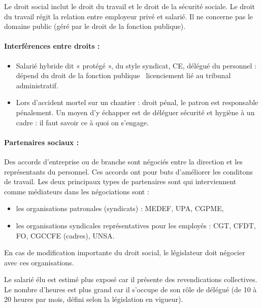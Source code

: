 Le droit social inclut le droit du travail et le droit de la sécurité sociale.
Le droit du travail régit la relation entre employeur privé et salarié.
Il ne concerne pas le domaine public (géré par le droit de la fonction publique).

\paragraph{Interférences entre droits :}
	\begin{itemize}
		\item[\textbullet] Salarié hybride dit « protégé », du style syndicat, CE, délégué du personnel : dépend du droit de la fonction publique \textrightarrow\ licenciement lié au tribunal administratif.
		\item[\textbullet] Lors d’accident mortel sur un chantier : droit pénal, le patron est responsable pénalement. Un moyen d'y échapper est de déléguer sécurité et hygiène à un cadre : il faut savoir ce à quoi on s'engage.
	\end{itemize}

\paragraph{Partenaires sociaux :}
	Des accords d'entreprise ou de branche sont négociés entre la direction et les représentants du personnel.
	Ces accords ont pour buts d'améliorer les conditons de travail.
	Les deux principaux types de partenaires sont qui interviennent comme médiateurs dans les négociations sont :
	\begin{itemize}
		\item[\textbullet] les organisations patronales (syndicats) : MEDEF, UPA, CGPME,
		\item[\textbullet] les organisations syndicales représentatives pour les employés : CGT, CFDT, FO, CGCCFE (cadres), UNSA.
	\end{itemize}
	En cas de modification importante du droit social, le législateur doit négocier avec ces organisations.

	Le salarié élu est estimé plus exposé car il présente des revendications collectives.
	Le nombre d'heures est plus grand car il s'occupe de son rôle de délégué (de 10 à 20 heures par mois, défini selon la législation en vigueur).